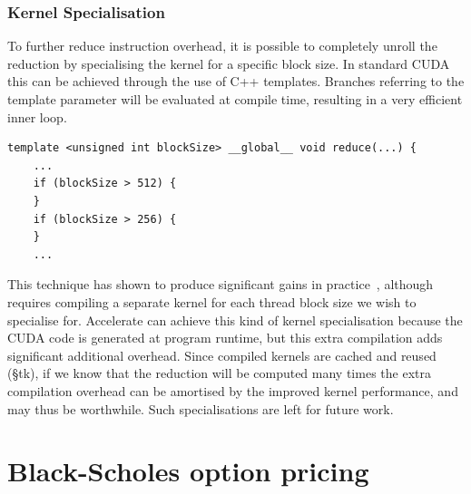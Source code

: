 \subsubsection{Kernel Specialisation}

To further reduce instruction overhead, it is possible to completely unroll the
reduction by specialising the kernel for a specific block size. In standard CUDA
this can be achieved through the use of C++ templates. Branches referring to the
template parameter will be evaluated at compile time, resulting in a very
efficient inner loop.
%
\begin{lstlisting}[style=cuda]
template <unsigned int blockSize> __global__ void reduce(...) {
    ...
    if (blockSize > 512) {
    }
    if (blockSize > 256) {
    }
    ...
\end{lstlisting}

This technique has shown to produce significant gains in
practice~\cite{Harris:2007te}, although requires compiling a separate kernel for
each thread block size we wish to specialise for. Accelerate can achieve this
kind of kernel specialisation because the CUDA code is generated at program
runtime, but this extra compilation adds significant additional overhead. Since
compiled kernels are cached and reused (\S tk), if we know that the reduction
will be computed many times the extra compilation overhead can be amortised by
the improved kernel performance, and may thus be worthwhile. Such
specialisations are left for future work.


\section{Black-Scholes option pricing}

